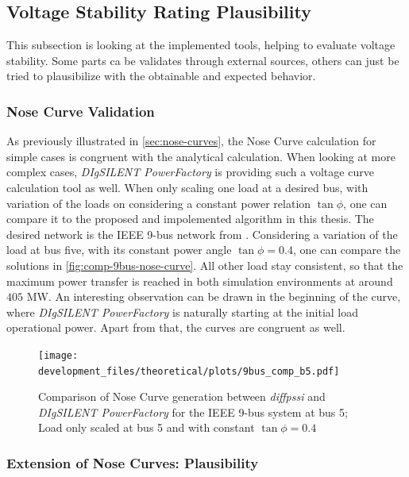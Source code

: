 \subsection{Voltage Stability Rating Plausibility}

This subsection is looking at the implemented tools, helping to evaluate voltage stability.
Some parts ca be validates through external sources, others can just be tried to plausibilize with the obtainable and expected behavior. 

\subsubsection{Nose Curve Validation}

As previously illustrated in \autoref{sec:nose-curves}, the Nose Curve calculation for simple cases is congruent with the analytical calculation.
When looking at more complex cases, \textit{DIgSILENT PowerFactory} is providing such a voltage curve calculation tool as well.
When only scaling one load at a desired bus, with variation of the loads on considering a constant power relation $\tan \phi$, one can compare it to the proposed and impolemented algorithm in this thesis.
The desired network is the IEEE 9-bus network from \quelle.
Considering a variation of the load at bus five, with its constant power angle $\tan \phi = 0.4$, one can compare the solutions in \autoref{fig:comp-9bus-nose-curve}.
All other load stay consistent, so that the maximum power transfer is reached in both simulation environments at around $405$ MW.
An interesting observation can be drawn in the beginning of the curve, where \textit{DIgSILENT PowerFactory} is naturally starting at the initial load operational power.
Apart from that, the curves are congruent as well.

\begin{figure}[htbp!]
    \centering
    \texttt{[image: development\_files/theoretical/plots/9bus\_comp\_b5.pdf]}
    \caption[Comparison of Nose Curve generation between \textit{diffpssi} and \textit{DIgSILENT PowerFactory} for the IEEE 9-bus system]{Comparison of Nose Curve generation between \textit{diffpssi} and \textit{DIgSILENT PowerFactory} for the IEEE 9-bus system at bus 5; Load only scaled at bus 5 and with constant $\tan \phi = 0.4$}
    \label{fig:comp-9bus-nose-curve}
\end{figure}

\subsubsection{Extension of Nose Curves: Plausibility}

